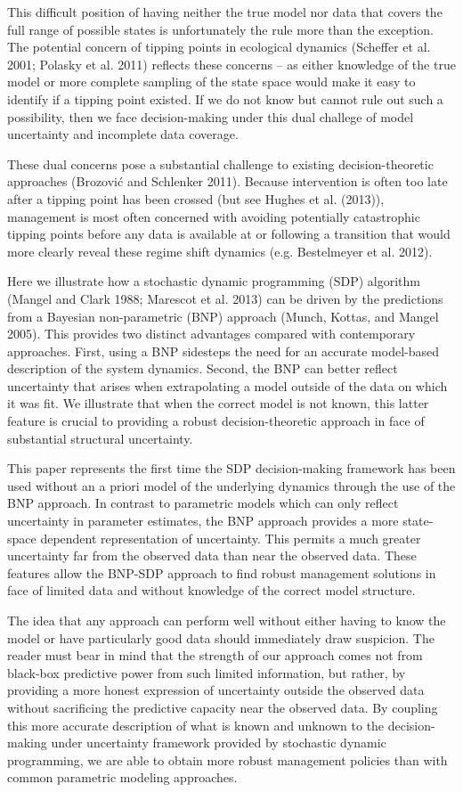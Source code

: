 \documentclass[author-year, review]{elsarticle} %
\begin{document}
This difficult position of having neither the true model nor data that
covers the full range of possible states is unfortunately the rule more
than the exception. The potential concern of tipping points in
ecological dynamics (Scheffer et al. 2001; Polasky et al. 2011) reflects
these concerns -- as either knowledge of the true model or more complete
sampling of the state space would make it easy to identify if a tipping
point existed. If we do not know but cannot rule out such a possibility,
then we face decision-making under this dual challege of model
uncertainty and incomplete data coverage.

These dual concerns pose a substantial challenge to existing
decision-theoretic approaches (Brozović and Schlenker 2011). Because
intervention is often too late after a tipping point has been crossed
(but see Hughes et al. (2013)), management is most often concerned with
avoiding potentially catastrophic tipping points before any data is
available at or following a transition that would more clearly reveal
these regime shift dynamics (e.g. Bestelmeyer et al. 2012).

Here we illustrate how a stochastic dynamic programming (SDP) algorithm
(Mangel and Clark 1988; Marescot et al. 2013) can be driven by the
predictions from a Bayesian non-parametric (BNP) approach (Munch,
Kottas, and Mangel 2005). This provides two distinct advantages compared
with contemporary approaches. First, using a BNP sidesteps the need for
an accurate model-based description of the system dynamics. Second, the
BNP can better reflect uncertainty that arises when extrapolating a
model outside of the data on which it was fit. We illustrate that when
the correct model is not known, this latter feature is crucial to
providing a robust decision-theoretic approach in face of substantial
structural uncertainty.

This paper represents the first time the SDP decision-making framework
has been used without an a priori model of the underlying dynamics
through the use of the BNP approach. In contrast to parametric models
which can only reflect uncertainty in parameter estimates, the BNP
approach provides a more state-space dependent representation of
uncertainty. This permits a much greater uncertainty far from the
observed data than near the observed data. These features allow the
BNP-SDP approach to find robust management solutions in face of limited
data and without knowledge of the correct model structure.

The idea that any approach can perform well without either having to
know the model or have particularly good data should immediately draw
suspicion. The reader must bear in mind that the strength of our
approach comes not from black-box predictive power from such limited
information, but rather, by providing a more honest expression of
uncertainty outside the observed data without sacrificing the predictive
capacity near the observed data. By coupling this more accurate
description of what is known and unknown to the decision-making under
uncertainty framework provided by stochastic dynamic programming, we are
able to obtain more robust management policies than with common
parametric modeling approaches.
\end{document}
